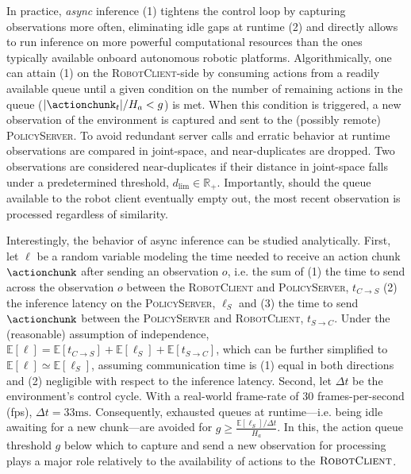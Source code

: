In practice, \emph{async} inference (1) tightens the control loop by capturing observations more often, eliminating idle gaps at runtime (2) and directly allows to run inference on more powerful computational resources than the ones typically available onboard autonomous robotic platforms.
Algorithmically, one can attain (1) on the \textsc{RobotClient}-side by consuming actions from a readily available queue until a given condition on the number of remaining actions in the queue (\(\vert \actionchunk_t \vert / H_a < g \)) is met. When this condition is triggered, a new observation of the environment is captured and sent to the (possibly remote) \textsc{PolicyServer}. 
To avoid redundant server calls and erratic behavior at runtime observations are compared in joint-space, and near-duplicates are dropped.
Two observations are considered near-duplicates if their distance in joint-space falls under a predetermined threshold, \( d_{\text{lim}} \in \mathbb R_+\).
Importantly, should the queue available to the robot client eventually empty out, the most recent observation is processed regardless of similarity.

Interestingly, the behavior of async inference can be studied analytically. First, let \( \ell \) be a random variable modeling the time needed to receive an action chunk \( \actionchunk \) after sending an observation \( o \), i.e. the sum of (1) the time to send across the observation \( o \) between the \textsc{RobotClient} and \textsc{PolicyServer}, \( t_{C \to S}\) (2) the inference latency on the \textsc{PolicyServer}, \( \ell_S \) and (3) the time to send \( \actionchunk \) between the \textsc{PolicyServer} and \textsc{RobotClient}, \( t_{S \to C} \). Under the (reasonable) assumption of independence, \( \mathbb E [\ell] = \mathbb E[t_{C \to S}] + \mathbb E[\ell_S] + \mathbb E[t_{S \to C}] \), which can be further simplified to \( \mathbb E[\ell] \simeq \mathbb E[\ell_S]  \), assuming communication time is (1) equal in both directions and (2) negligible with respect to the inference latency. Second, let \(\Delta t\) be the environment's control cycle. With a real-world frame-rate of 30 frames-per-second (fps), \(\Delta t=33\text{ms}\). Consequently, exhausted queues at runtime---i.e. being idle awaiting for a new chunk---are avoided for \( g \geq \frac{\mathbb E[\ell_S] / \Delta t}{H_a} \). In this, the action queue threshold \( g \) below which to capture and send a new observation for processing plays a major role relatively to the availability of actions to the \( \textsc{RobotClient} \).

